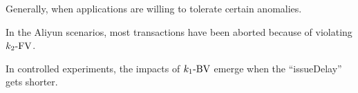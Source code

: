 \begin{frame}{}
  Generally, \rvsi{} 
  when applications are willing to tolerate certain anomalies.

  \pause
  \vspace{0.6cm}
  \begin{description}[<+->]
    \setlength{\itemsep}{5pt}
    \item[$\ktwofv$:] In the Aliyun scenarios, most transactions have been aborted because of violating $\ktwofv$.
    \item[$\konebv$:] In controlled experiments, the impacts of $\konebv$ emerge when the ``issueDelay'' gets shorter.
    \item[$\kthreesv$:] 
  \end{description}
\end{frame}
